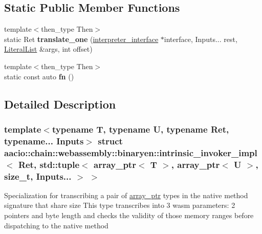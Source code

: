 \subsection*{Static Public Member Functions}
\begin{DoxyCompactItemize}
\item 
\mbox{\label{structaacio_1_1chain_1_1webassembly_1_1binaryen_1_1intrinsic__invoker__impl_3_01_ret_00_01std_1_bb369d557572a35c29e4f57bf73f5335_abcd6fd0b0f4945778129ddd8fa2df619}} 
{\footnotesize template$<$then\+\_\+type Then$>$ }\\static Ret {\bfseries translate\+\_\+one} (\mbox{\hyperlink{structaacio_1_1chain_1_1webassembly_1_1binaryen_1_1interpreter__interface}{interpreter\+\_\+interface}} $\ast$interface, Inputs... rest, \mbox{\hyperlink{classstd_1_1vector}{Literal\+List}} \&args, int offset)
\item 
\mbox{\label{structaacio_1_1chain_1_1webassembly_1_1binaryen_1_1intrinsic__invoker__impl_3_01_ret_00_01std_1_bb369d557572a35c29e4f57bf73f5335_a4d4561c0e6e35c371ed3306b7d96c57f}} 
{\footnotesize template$<$then\+\_\+type Then$>$ }\\static const auto {\bfseries fn} ()
\end{DoxyCompactItemize}


\subsection{Detailed Description}
\subsubsection*{template$<$typename T, typename U, typename Ret, typename... Inputs$>$\newline
struct aacio\+::chain\+::webassembly\+::binaryen\+::intrinsic\+\_\+invoker\+\_\+impl$<$ Ret, std\+::tuple$<$ array\+\_\+ptr$<$ T $>$, array\+\_\+ptr$<$ U $>$, size\+\_\+t, Inputs... $>$ $>$}

Specialization for transcribing a pair of \mbox{\hyperlink{structaacio_1_1chain_1_1array__ptr}{array\+\_\+ptr}} types in the native method signature that share size This type transcribes into 3 wasm parameters\+: 2 pointers and byte length and checks the validity of those memory ranges before dispatching to the native method


